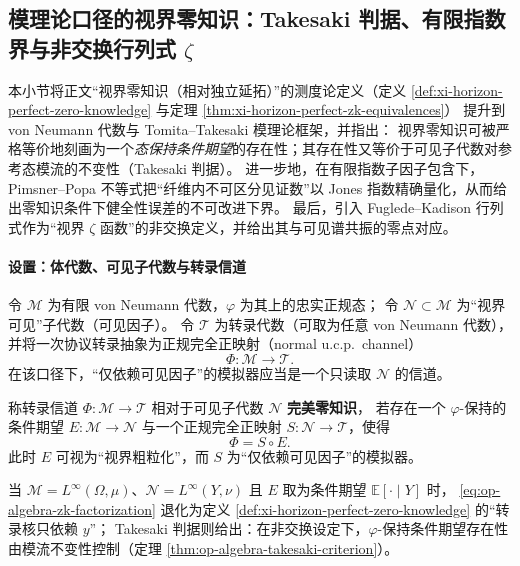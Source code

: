 \subsection{模理论口径的视界零知识：Takesaki 判据、有限指数界与非交换行列式 \texorpdfstring{$\zeta$}{zeta}}\label{subsec:op-algebra-modular-zk-index-fkdet}
本小节将正文“视界零知识（相对独立延拓）”的测度论定义（定义 \ref{def:xi-horizon-perfect-zero-knowledge} 与定理 \ref{thm:xi-horizon-perfect-zk-equivalences}）
提升到 von Neumann 代数与 Tomita--Takesaki 模理论框架，并指出：
视界零知识可被严格等价地刻画为一个\emph{态保持条件期望}的存在性；其存在性又等价于可见子代数对参考态模流的不变性（Takesaki 判据）。
进一步地，在有限指数子因子包含下，Pimsner--Popa 不等式把“纤维内不可区分见证数”以 Jones 指数精确量化，从而给出零知识条件下健全性误差的不可改进下界。
最后，引入 Fuglede--Kadison 行列式作为“视界 \(\zeta\) 函数”的非交换定义，并给出其与可见谱共振的零点对应。

\paragraph{设置：体代数、可见子代数与转录信道}
令 \(\mathcal{M}\) 为有限 von Neumann 代数，\(\varphi\) 为其上的忠实正规态；
令 \(\mathcal{N}\subset \mathcal{M}\) 为“视界可见”子代数（可见因子）。
令 \(\mathcal{T}\) 为转录代数（可取为任意 von Neumann 代数），并将一次协议转录抽象为正规完全正映射（normal u.c.p.\ channel）
\[
\Phi:\mathcal{M}\to\mathcal{T}.
\]
在该口径下，“仅依赖可见因子”的模拟器应当是一个只读取 \(\mathcal{N}\) 的信道。

\begin{definition}[算子代数口径的视界完美零知识]\label{def:op-algebra-horizon-perfect-zk}
称转录信道 \(\Phi:\mathcal{M}\to\mathcal{T}\) 相对于可见子代数 \(\mathcal{N}\) \textbf{完美零知识}，
若存在一个 \(\varphi\)-保持的条件期望 \(E:\mathcal{M}\to\mathcal{N}\) 与一个正规完全正映射 \(S:\mathcal{N}\to\mathcal{T}\)，使得
\begin{equation}\label{eq:op-algebra-zk-factorization}
\boxed{\;\Phi=S\circ E.\;}
\end{equation}
此时 \(E\) 可视为“视界粗粒化”，而 \(S\) 为“仅依赖可见因子”的模拟器。
\end{definition}

\begin{remark}[与正文测度论定义的对应]\label{rem:op-algebra-zk-vs-measure}
当 \(\mathcal{M}=L^\infty(\Omega,\mu)\)、\(\mathcal{N}=L^\infty(Y,\nu)\) 且 \(E\) 取为条件期望 \(\mathbb{E}[\cdot\mid Y]\) 时，
\eqref{eq:op-algebra-zk-factorization} 退化为定义 \ref{def:xi-horizon-perfect-zero-knowledge} 的“转录核只依赖 \(y\)”；
Takesaki 判据则给出：在非交换设定下，\(\varphi\)-保持条件期望存在性由模流不变性控制（定理 \ref{thm:op-algebra-takesaki-criterion}）。
\end{remark}

